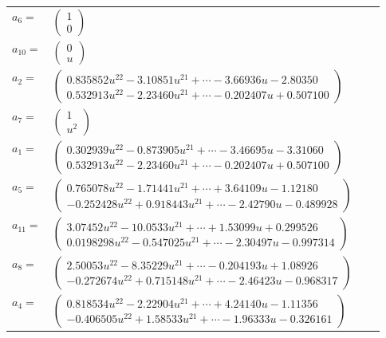 \documentclass[1p]{elsarticle_modified}
\theoremstyle{definition}
\begin{document}
\begin{tabular}{m{7pt} m{180pt} m{7pt} m{180pt} }
\flushright $a_{6}=$&$\begin{pmatrix}1\\0\end{pmatrix}$ \\
\flushright $a_{10}=$&$\begin{pmatrix}0\\u\end{pmatrix}$ \\
\flushright $a_{2}=$&$\begin{pmatrix}0.835852 u^{22}-3.10851 u^{21}+\cdots-3.66936 u-2.80350\\0.532913 u^{22}-2.23460 u^{21}+\cdots-0.202407 u+0.507100\end{pmatrix}$ \\
\flushright $a_{7}=$&$\begin{pmatrix}1\\u^2\end{pmatrix}$ \\
\flushright $a_{1}=$&$\begin{pmatrix}0.302939 u^{22}-0.873905 u^{21}+\cdots-3.46695 u-3.31060\\0.532913 u^{22}-2.23460 u^{21}+\cdots-0.202407 u+0.507100\end{pmatrix}$ \\
\flushright $a_{5}=$&$\begin{pmatrix}0.765078 u^{22}-1.71441 u^{21}+\cdots+3.64109 u-1.12180\\-0.252428 u^{22}+0.918443 u^{21}+\cdots-2.42790 u-0.489928\end{pmatrix}$ \\
\flushright $a_{11}=$&$\begin{pmatrix}3.07452 u^{22}-10.0533 u^{21}+\cdots+1.53099 u+0.299526\\0.0198298 u^{22}-0.547025 u^{21}+\cdots-2.30497 u-0.997314\end{pmatrix}$ \\
\flushright $a_{8}=$&$\begin{pmatrix}2.50053 u^{22}-8.35229 u^{21}+\cdots-0.204193 u+1.08926\\-0.272674 u^{22}+0.715148 u^{21}+\cdots-2.46423 u-0.968317\end{pmatrix}$ \\
\flushright $a_{4}=$&$\begin{pmatrix}0.818534 u^{22}-2.22904 u^{21}+\cdots+4.24140 u-1.11356\\-0.406505 u^{22}+1.58533 u^{21}+\cdots-1.96333 u-0.326161\end{pmatrix}$ \\

\end{tabular}
\end{document}

